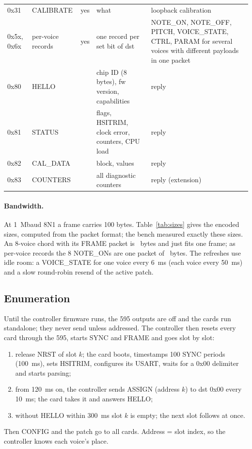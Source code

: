 \documentclass[11pt,a4paper]{article}
\begin{document}
\begin{table}[htbp]
\begin{tabularx}{\textwidth}{@{}l l c >{\raggedright}p{4.2cm} >{\raggedright\arraybackslash}X@{}}
0x31 & CALIBRATE & yes & what & loopback calibration \\
0x5x, 0x6x & per-voice records & yes & one record per set bit of dst & NOTE\_ON, NOTE\_OFF, PITCH, VOICE\_STATE, CTRL,
  PARAM for several voices with different payloads in one packet \\
\midrule
0x80 & HELLO & & chip ID (8 bytes), fw version, capabilities & reply \\
0x81 & STATUS & & flags, HSITRIM, clock error, counters, CPU load & reply \\
0x82 & CAL\_DATA & & block, values & reply \\
0x83 & COUNTERS & & all diagnostic counters & reply (extension) \\
\bottomrule
\end{tabularx}
\end{table}

\paragraph{Bandwidth.} At \SI{1}{Mbaud} 8N1 a frame carries 100 bytes. Table~\ref{tab:sizes} gives the encoded sizes,
computed from the packet format; the bench measured exactly these sizes. An 8-voice chord with its FRAME packet is
\statBusChord\ bytes and just fits one frame; as per-voice records the 8 NOTE\_ONs are one packet of
\statBusMultiChord\ bytes. The refreshes use idle room: a VOICE\_STATE for one voice every \SI{6}{ms} (each voice every
\SI{50}{ms}) and a slow round-robin resend of the active patch.

\begin{table}[htbp]
\centering\small
\caption{Packet sizes in bytes (generated: COBS overhead and delimiter included).}\label{tab:sizes}

\end{table}

\subsection{Enumeration}
Until the controller firmware runs, the 595 outputs are off and the cards run standalone; they never send unless
addressed. The controller then resets every card through the 595, starts SYNC and FRAME and goes slot by slot:
\begin{enumerate}
  \item release NRST of slot $k$; the card boots, timestamps 100 SYNC periods (\SI{100}{ms}), sets HSITRIM,
    configures its USART, waits for a 0x00 delimiter and starts parsing;
  \item from \SI{120}{ms} on, the controller sends ASSIGN (address $k$) to dst 0x00 every \SI{10}{ms}; the card takes it
    and answers HELLO;
  \item without HELLO within \SI{300}{ms} slot $k$ is empty; the next slot follows at once.
\end{enumerate}
Then CONFIG and the patch go to all cards. Address = slot index, so the controller knows each voice's place.
\end{document}
